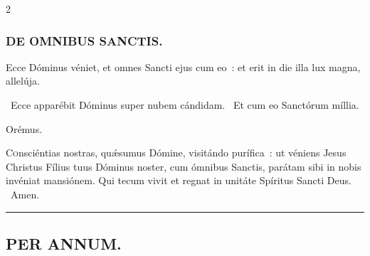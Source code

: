 \documentclass[9pt,twoside]{extarticle}
\begin{document}
\begin{multicols}{2}
{\subsubsection*{\center \textsc{DE OMNIBUS SANCTIS.}}
\begin{tightlist}{}
\item {} Ecce Dóminus véniet, et omnes Sancti ejus cum eo~: et erit in die illa lux magna, allelúja.
\item {}~Ecce apparébit Dóminus super nubem cándidam. ~Et cum eo Sanctórum míllia.
\item Orémus. \hfill {}
\end{tightlist}
\lettrine{C}onsciéntias nostras, quǽsumus Dómine, visitándo purífica~: ut véniens Jesus Christus Fílius tuus Dóminus noster, cum ómnibus Sanctis, parátam sibi in nobis invéniat mansiónem. Qui tecum vivit et regnat in unitáte Spíritus Sancti Deus. ~Amen.

\begin{center}\textcolor{red}{\rule{\linewidth}{0.5pt}} \end{center}

\subsection*{\center \textsc{PER ANNUM.}}
}
\end{multicols}
\end{document}
